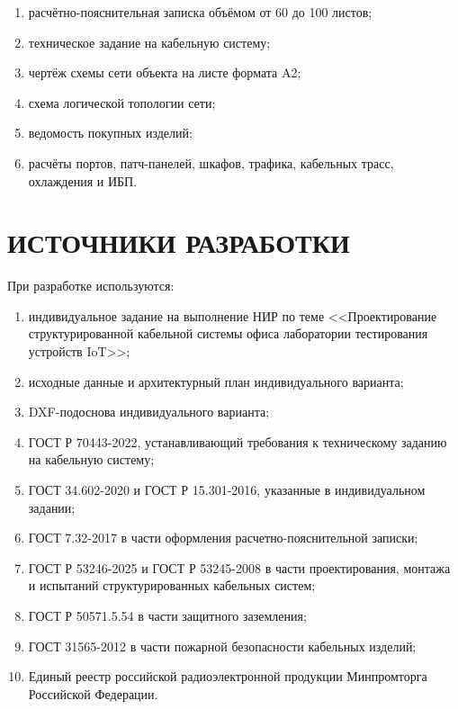 \documentclass{bmstu}
\begin{document}
\begin{appendices}
\begin{enumerate}[label=\asbuk*)]
    \item расчётно-пояснительная записка объёмом от 60 до 100 листов;
    \item техническое задание на кабельную систему;
    \item чертёж схемы сети объекта на листе формата A2;
    \item схема логической топологии сети;
    \item ведомость покупных изделий;
    \item расчёты портов, патч-панелей, шкафов, трафика, кабельных трасс, охлаждения и ИБП.
\end{enumerate}


\section{ИСТОЧНИКИ РАЗРАБОТКИ}

При разработке используются:

\begin{enumerate}[label=\asbuk*)]
    \item индивидуальное задание на выполнение НИР по теме <<Проектирование структурированной кабельной системы офиса лаборатории тестирования устройств IoT>>;
    \item исходные данные и архитектурный план индивидуального варианта;
    \item DXF-подоснова индивидуального варианта;
    \item ГОСТ Р 70443-2022, устанавливающий требования к техническому заданию на кабельную систему;
    \item ГОСТ 34.602-2020 и ГОСТ Р 15.301-2016, указанные в индивидуальном задании;
    \item ГОСТ 7.32-2017 в части оформления расчетно-пояснительной записки;
    \item ГОСТ Р 53246-2025 и ГОСТ Р 53245-2008 в части проектирования, монтажа и испытаний структурированных кабельных систем;
    \item ГОСТ Р 50571.5.54 в части защитного заземления;
    \item ГОСТ 31565-2012 в части пожарной безопасности кабельных изделий;
    \item Единый реестр российской радиоэлектронной продукции Минпромторга Российской Федерации.
\end{enumerate}





\end{appendices}
\end{document}
